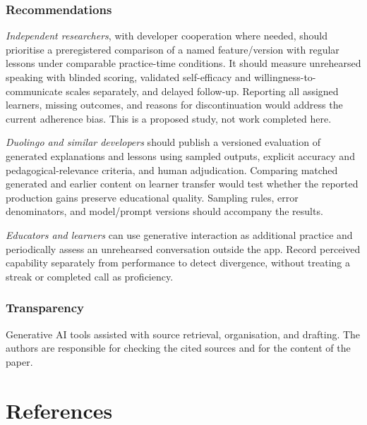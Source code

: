 \documentclass[11pt,titlepage]{article}
\begin{document}
\subsubsection{Recommendations}
\emph{Independent researchers}, with developer cooperation where needed, should prioritise a preregistered comparison of a named feature/version with regular lessons under comparable practice-time conditions. It should measure unrehearsed speaking with blinded scoring, validated self-efficacy and willingness-to-communicate scales separately, and delayed follow-up. Reporting all assigned learners, missing outcomes, and reasons for discontinuation would address the current adherence bias. This is a proposed study, not work completed here.

\emph{Duolingo and similar developers} should publish a versioned evaluation of generated explanations and lessons using sampled outputs, explicit accuracy and pedagogical-relevance criteria, and human adjudication. Comparing matched generated and earlier content on learner transfer would test whether the reported production gains preserve educational quality. Sampling rules, error denominators, and model/prompt versions should accompany the results.

\emph{Educators and learners} can use generative interaction as additional practice and periodically assess an unrehearsed conversation outside the app. Record perceived capability separately from performance to detect divergence, without treating a streak or completed call as proficiency.

\subsubsection{Transparency}
Generative AI tools assisted with source retrieval, organisation, and drafting. The authors are responsible for checking the cited sources and for the content of the paper.

\clearpage
\section*{References}
\printbibliography[heading=none]
\end{document}
